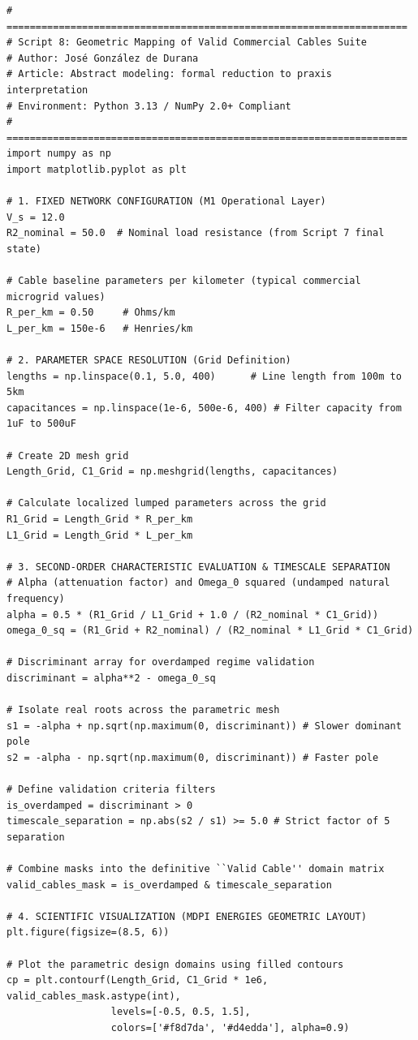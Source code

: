 \documentclass[11pt, a4paper]{article}
\begin{document}
{\footnotesize
\begin{verbatim}
# =====================================================================
# Script 8: Geometric Mapping of Valid Commercial Cables Suite
# Author: José González de Durana
# Article: Abstract modeling: formal reduction to praxis interpretation
# Environment: Python 3.13 / NumPy 2.0+ Compliant
# =====================================================================
import numpy as np
import matplotlib.pyplot as plt

# 1. FIXED NETWORK CONFIGURATION (M1 Operational Layer)
V_s = 12.0
R2_nominal = 50.0  # Nominal load resistance (from Script 7 final state)

# Cable baseline parameters per kilometer (typical commercial microgrid values)
R_per_km = 0.50     # Ohms/km
L_per_km = 150e-6   # Henries/km

# 2. PARAMETER SPACE RESOLUTION (Grid Definition)
lengths = np.linspace(0.1, 5.0, 400)      # Line length from 100m to 5km
capacitances = np.linspace(1e-6, 500e-6, 400) # Filter capacity from 1uF to 500uF

# Create 2D mesh grid
Length_Grid, C1_Grid = np.meshgrid(lengths, capacitances)

# Calculate localized lumped parameters across the grid
R1_Grid = Length_Grid * R_per_km
L1_Grid = Length_Grid * L_per_km

# 3. SECOND-ORDER CHARACTERISTIC EVALUATION & TIMESCALE SEPARATION
# Alpha (attenuation factor) and Omega_0 squared (undamped natural frequency)
alpha = 0.5 * (R1_Grid / L1_Grid + 1.0 / (R2_nominal * C1_Grid))
omega_0_sq = (R1_Grid + R2_nominal) / (R2_nominal * L1_Grid * C1_Grid)

# Discriminant array for overdamped regime validation
discriminant = alpha**2 - omega_0_sq

# Isolate real roots across the parametric mesh
s1 = -alpha + np.sqrt(np.maximum(0, discriminant)) # Slower dominant pole
s2 = -alpha - np.sqrt(np.maximum(0, discriminant)) # Faster pole

# Define validation criteria filters
is_overdamped = discriminant > 0
timescale_separation = np.abs(s2 / s1) >= 5.0 # Strict factor of 5 separation

# Combine masks into the definitive ``Valid Cable'' domain matrix
valid_cables_mask = is_overdamped & timescale_separation

# 4. SCIENTIFIC VISUALIZATION (MDPI ENERGIES GEOMETRIC LAYOUT)
plt.figure(figsize=(8.5, 6))

# Plot the parametric design domains using filled contours
cp = plt.contourf(Length_Grid, C1_Grid * 1e6, valid_cables_mask.astype(int),
                  levels=[-0.5, 0.5, 1.5],
                  colors=['#f8d7da', '#d4edda'], alpha=0.9)


\end{verbatim}}
\end{document}
